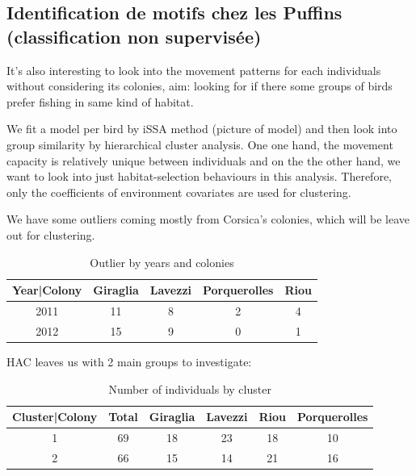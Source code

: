 \documentclass{article}
\begin{document}
\subsection{Identification de motifs chez les Puffins (classification non supervisée)}

It’s also interesting to look into the movement patterns for each individuals without considering its colonies, aim: looking for if there some groups of birds prefer fishing in same kind of habitat.

We fit a model per bird by iSSA method (picture of model) and then look into group similarity by hierarchical cluster analysis. One one hand, the movement capacity is relatively unique between individuals and on the the other hand, we want to look into just habitat-selection behaviours in this analysis. Therefore, only the coefficients of environment covariates are used for clustering.

We have some outliers coming mostly from Corsica's colonies, which will be leave out for clustering.

\begin{table}[ht]
\centering
\begin{tabular}{c|c c c c}
Year|Colony       & Giraglia & Lavezzi & Porquerolles & Riou\\
\hline
2011              & 11 & 8 & 2 & 4  \\
2012              & 15 & 9 & 0 & 1  \\
\end{tabular}
\caption{Outlier by years and colonies}
\end{table}

HAC leaves us with 2 main groups to investigate:

\begin{table}[ht]
\centering
\begin{tabular}{c|c|cccc}
Cluster|Colony       &Total & Giraglia & Lavezzi & Riou & Porquerolles\\
\hline
1              & 69 & 18 & 23 & 18 & 10 \\
2              & 66 & 15 & 14 & 21 & 16 \\

\end{tabular}
\caption{Number of individuals by cluster}
\end{table}
\end{document}
